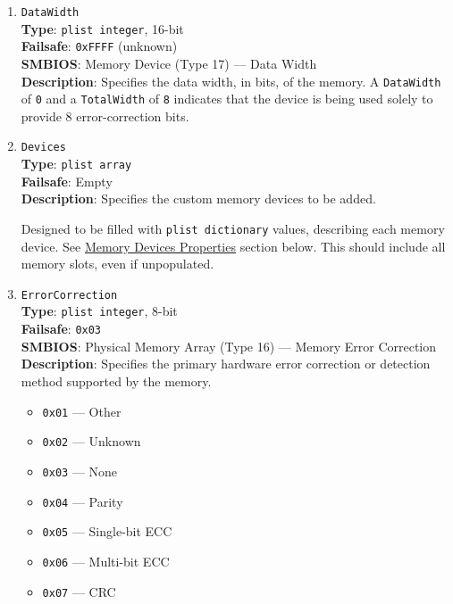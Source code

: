\documentclass[]{article}
\providecommand{\tightlist}{%
  \setlength{\itemsep}{0pt}\setlength{\parskip}{0pt}}
\begin{document}
\begin{enumerate}
\item
  \texttt{DataWidth}\\
  \textbf{Type}: \texttt{plist\ integer}, 16-bit\\
  \textbf{Failsafe}: \texttt{0xFFFF} (unknown)\\
  \textbf{SMBIOS}: Memory Device (Type 17) --- Data Width\\
  \textbf{Description}: Specifies the data width, in bits, of the
  memory. A \texttt{DataWidth} of \texttt{0} and a \texttt{TotalWidth} of \texttt{8}
  indicates that the device is being used solely to provide 8
  error-correction bits.

\item
  \texttt{Devices}\\
  \textbf{Type}: \texttt{plist\ array}\\
  \textbf{Failsafe}: Empty\\
  \textbf{Description}: Specifies the custom memory devices to be added.

  Designed to be filled with \texttt{plist\ dictionary} values, describing each
  memory device. See \hyperref[platforminfomemorydevice]{Memory Devices Properties}
  section below. This should include all memory slots, even if unpopulated.

\item
  \texttt{ErrorCorrection}\\
  \textbf{Type}: \texttt{plist\ integer}, 8-bit\\
  \textbf{Failsafe}: \texttt{0x03}\\
  \textbf{SMBIOS}: Physical Memory Array (Type 16) --- Memory Error Correction\\
  \textbf{Description}: Specifies the primary hardware error correction or
  detection method supported by the memory.

  \begin{itemize}
  \tightlist
  \item
    \texttt{0x01} --- Other
  \item
    \texttt{0x02} --- Unknown
  \item
    \texttt{0x03} --- None
  \item
    \texttt{0x04} --- Parity
  \item
    \texttt{0x05} --- Single-bit ECC
  \item
    \texttt{0x06} --- Multi-bit ECC
  \item
    \texttt{0x07} --- CRC
  \end{itemize}


\end{enumerate}
\end{document}
